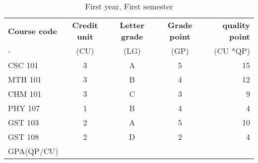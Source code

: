 \documentclass{article}
\begin{document}
 
 \begin{table}[h!]
  \begin{center}
 \caption{First year, First semester}
   \label{tab:Table}
	\begin{tabular}{l|c|c|c|r}
	\hline
	\textbf{Course code} & \textbf{Credit unit} & \textbf{Letter grade} & \textbf{Grade point} & \textbf{quality point}\\
			- & (CU) & (LG) & (GP) & (CU *QP)\\
	\hline 
    \cellcolor{green!25}CSC 101 &3 & A & 5 & 15\\
	\hline 
    \cellcolor{blue!35}MTH 101 & 3 & B & 4 & 12\\
	\hline 
    \cellcolor{red!20}CHM 101 & 3 & C & 3 & 9\\
	\hline 
    \cellcolor{green!30}PHY 107 & 1 & B & 4 & 4\\
	\hline 
    \cellcolor{red!35}GST 103 & 2 & A & 5 & 
    10\\
	\hline 
	\cellcolor{blue!20}GST 108 & 2 & D & 2 & 4\\
		\hline 
	\cellcolor{red!25}GPA(QP/CU) & & & & \\		
					\hline 
	\end{tabular}	
	\end{center}
\end{table}
\end{document}
